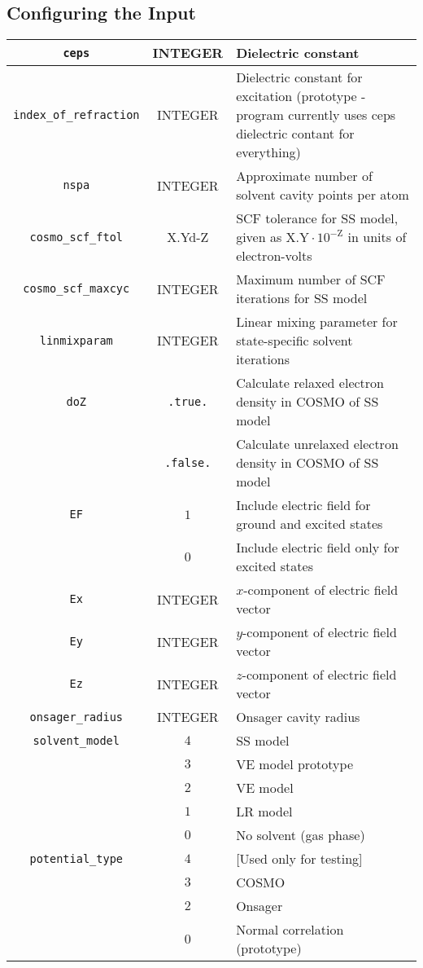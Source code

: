 \documentclass[12pt,letter,footinclude=true,headinclude=true,hyphens]{book} %
\begin{document}
    \subsection{Configuring the Input}
    \label{solvent-models-input}
    
    \begin{tabular}{ | c | c | p{7cm} | }
    \hline
    \texttt{ceps} & INTEGER & Dielectric constant \\ \hline
    \texttt{index\_of\_refraction} & INTEGER & Dielectric constant for excitation (prototype - program currently uses ceps dielectric contant for everything) \\ \hline
    \texttt{nspa} & INTEGER & Approximate number of solvent cavity points per atom \\ \hline
    \texttt{cosmo\_scf\_ftol} & X.Yd-Z & SCF tolerance for SS model, given as $\mathrm{X.Y} \cdot 10^{-\mathrm{Z}}$ in units of electron-volts \\ \hline
    \texttt{cosmo\_scf\_maxcyc} & INTEGER & Maximum number of SCF iterations for SS model \\ \hline
    \texttt{linmixparam} & INTEGER & Linear mixing parameter for state-specific solvent iterations \\ \hline
    \texttt{doZ} & \texttt{.true.} & Calculate relaxed electron density in COSMO of SS model \\
    & \texttt{.false.} & Calculate unrelaxed electron density in COSMO of SS model \\ \hline
    \texttt{EF} & $1$ & Include electric field for ground and excited states \\
    & $0$ & Include electric field only for excited states \\ \hline
    \texttt{Ex} & INTEGER & $x$-component of electric field vector \\ \hline
    \texttt{Ey} & INTEGER & $y$-component of electric field vector \\ \hline
    \texttt{Ez} & INTEGER & $z$-component of electric field vector \\ \hline
    \texttt{onsager\_radius} & INTEGER & Onsager cavity radius \\ \hline
    \texttt{solvent\_model}
    & $4$ & SS model \\
    & $3$ & VE model prototype \\
    & $2$ & VE model \\
    & $1$ & LR model \\
    & $0$ & No solvent (gas phase) \\ \hline
    \texttt{potential\_type} & $4$ & [Used only for testing] \\
    & $3$ & COSMO \\
    & $2$ & Onsager \\
    & $0$ & Normal correlation (prototype) \\
    \hline
    \end{tabular}
    
\end{document}

